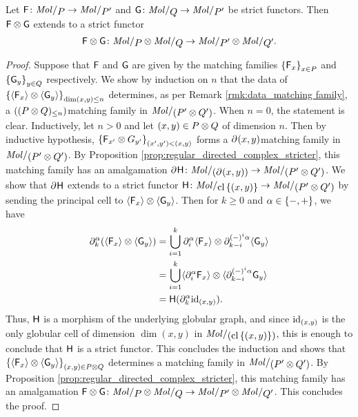 \begin{lem} \label{lem:gray_of_strict_functors}
    Let \( \F \colon \molecin{P} \to \molecin{P'} \) and \( \G \colon \molecin{Q} \to \molecin{P'} \) be strict functors. 
    Then \( \F \gray \G \) extends to a strict functor 
    \begin{equation*}
        \F \gray \G \colon \molecin{P} \gray \molecin{Q} \to \molecin{P'} \gray \molecin{Q'}.
    \end{equation*}
\end{lem}
\begin{proof}
    Suppose that \( \F \) and \( \G \) are given by the matching families \( \set{\F_x}_{x \in P} \) and \( \set{\G_y}_{y \in Q} \) respectively.
    We show by induction on \( n \) that the data of \( \set{\pcell{\F_x} \gray \pcell{\G_y}}_{\dim (x, y) \le n} \) determines, as per Remark \ref{rmk:data_matching family}, a \( (\gr{\le n}{(P \gray Q)}) \)\nbd matching family in \( \molecin{(P' \gray Q')} \).
    When \( n = 0 \), the statement is clear. 
    Inductively, let \( n > 0 \) and let \( (x, y) \in P \gray Q \) of dimension \( n \). 
    Then by inductive hypothesis, \( \set{\F_{x'} \gray G_{y'}}_{(x', y') < (x, y)} \) forms a \( \bd{}{} (x, y) \)\nbd matching family in \( \molecin{(P' \gray Q')} \).
    By Proposition \ref{prop:regular_directed_complex_stricter}, this matching family has an amalgamation \( \bd{}{}\fun{H} \colon \molecin{(\bd{}{} (x, y))} \to \molecin{(P' \gray Q')} \).
    We show that \( \bd{}{} \fun{H} \) extends to a strict functor \( \fun{H} \colon \molecin{\clset{(x, y)}} \to \molecin{(P' \gray Q')} \) by sending the principal cell to \( \pcell{\F_x} \gray \pcell{\G_y} \).
    Then for \( k \geq 0 \) and \( \a \in \set{-, +} \), we have
    \begin{align*}
        \bd{k}{\a} (\pcell{\F_x} \gray \pcell{\G_y}) &= \bigcup_{i = 1}^k \bd{i}{\a} \pcell{\F_x} \gray \bd{k - i}{(-)^i\a} \pcell{\G_y} \\
                                       &= \bigcup_{i = 1}^k \pcell{\bd{i}{\a} \F_x} \gray \pcell{\bd{k - i}{(-)^i\a} \G_y} \\
                                       &= \fun{H}(\bd{k}{\a} \idd{(x, y)}).
    \end{align*}
    Thus, \( \fun{H} \) is a morphism of the underlying globular graph, and since \( \idd{(x, y)} \) is the only globular cell of dimension \( \dim (x, y) \) in \( \molecin{(\clset{(x, y)})} \), this is enough to conclude that \( \fun{H} \) is a strict functor.
    This concludes the induction and shows that \( \set{\pcell{\F_x} \gray \pcell{\G_y}}_{(x, y) \in P \gray Q} \) determines a matching family in \( \molecin{(P' \gray Q')} \).
    By Proposition \ref{prop:regular_directed_complex_stricter}, this matching family has an amalgamation \( \F \gray \G \colon \molecin{P} \gray \molecin{Q} \to \molecin{P'} \gray \molecin{Q'} \).
    This concludes the proof.

\end{proof}

